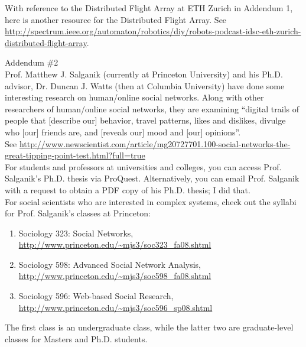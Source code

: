 With reference to the Distributed Flight Array at ETH Zurich in Addendum 1, here is another resource for the Distributed Flight Array. See \url{http://spectrum.ieee.org/automaton/robotics/diy/robots-podcast-idsc-eth-zurich-distributed-flight-array}. \\


\vspace{1cm}

Addendum \#2 \\

Prof. Matthew J. Salganik (currently at Princeton University) and his Ph.D. advisor, Dr. Duncan J. Watts (then at Columbia University) have done some interesting research on human/online social networks. Along with other researchers of human/online social networks, they are examining ``digital trails of people that [describe our] behavior, travel patterns, likes and dislikes, divulge who [our] friends are, and [reveals our] mood and [our] opinions''.  \\

See \url{http://www.newscientist.com/article/mg20727701.100-social-networks-the-great-tipping-point-test.html?full=true} \\

For students and professors at universities and colleges, you can access Prof. Salganik's Ph.D. thesis via ProQuest. Alternatively, you can email Prof. Salganik with a request to obtain a PDF copy of his Ph.D. thesis; I did that. \\

For social scientists who are interested in complex systems, check out the syllabi for Prof. Salganik's classes at Princeton: \vspace{-0.3cm}
\begin{enumerate} \itemsep -4pt
\item Sociology 323: Social Networks, \url{http://www.princeton.edu/~mjs3/soc323_fa08.shtml}
\item Sociology 598: Advanced Social Network Analysis, \url{http://www.princeton.edu/~mjs3/soc598_fa08.shtml}
\item Sociology 596: Web-based Social Research, \url{http://www.princeton.edu/~mjs3/soc596_sp08.shtml}
\end{enumerate}


The first class is an undergraduate class, while the latter two are graduate-level classes for Masters and Ph.D. students.